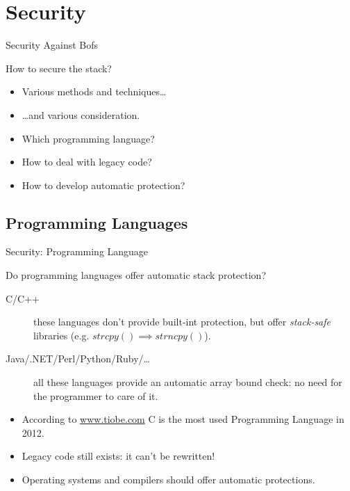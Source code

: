 \section{Security}
\begin{frame}{Security Against Bofs}
	\begin{block}{How to secure the stack?}
		\begin{itemize}
			\item Various methods and techniques\ldots
			\item \ldots{}and various consideration.
			\item Which programming language?
			\item How to deal with legacy code?
			\item How to develop automatic protection?
		\end{itemize}
	\end{block}
\end{frame}

\subsection{Programming Languages}
\begin{frame}{Security: Programming Language}
	\begin{block}{Do programming languages offer automatic stack protection?}
		\begin{description}
			\item[C/C++]these languages don't provide built-int protection, but offer
				\emph{stack-safe} libraries (e.g. $strcpy() \implies strncpy()$).
			\item[Java/.NET/Perl/Python/Ruby/\ldots]all these languages provide an
				automatic array bound check: no need for the programmer to care of it.
		\end{description}
		\begin{itemize}
			\item According to \url{www.tiobe.com} C is the most used Programming Language in 2012.
			\item \alert{Legacy code still exists: it can't be rewritten!}
			\item Operating systems and compilers should offer automatic protections.
		\end{itemize}
	\end{block}
\end{frame}


